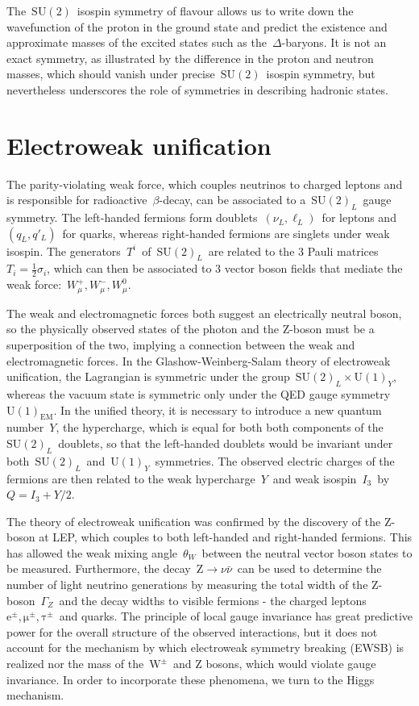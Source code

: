 The~$\mathrm{SU}(2)$~isospin symmetry of flavour allows us to write down the wavefunction of the proton in the ground state and predict the existence and approximate masses of the excited states such as the~$\Delta$-baryons. It is not an exact symmetry, as illustrated by the difference in the proton and neutron masses, which should vanish under precise~$\mathrm{SU}(2)$~isospin symmetry, but nevertheless underscores the role of symmetries in describing hadronic states.

\section{Electroweak unification}
The parity-violating weak force, which couples neutrinos to charged leptons and is responsible for radioactive~$\beta$-decay, can be associated to a~$\mathrm{SU}(2)_L$~gauge symmetry. The left-handed fermions form doublets~$(\nu_L, \mathrm{\ell}_L)$~for leptons and~$(q_L, q'_L)$~for quarks, whereas right-handed fermions are singlets under weak isospin. The generators~$T^i$~of~$\mathrm{SU}(2)_L$~are related to the 3 Pauli matrices~$T_i = \frac{1}{2}\sigma_i$, which can then be associated to 3 vector boson fields that mediate the weak force:~$W^+_\mu, W^-_\mu, W^0_\mu$.

The weak and electromagnetic forces both suggest an electrically neutral boson, so the physically observed states of the photon and the Z-boson must be a superposition of the two, implying a connection between the weak and electromagnetic forces. In the Glashow-Weinberg-Salam theory of electroweak unification, the Lagrangian is symmetric under the group~$\mathrm{SU}(2)_L \times \mathrm{U}(1)_Y$, whereas the vacuum state is symmetric only under the QED gauge symmetry~$\mathrm{U}(1)_{\mathrm{EM}}$. In the unified theory, it is necessary to introduce a new quantum number~$Y$, the hypercharge, which is equal for both both components of the~$\mathrm{SU}(2)_L$~doublets, so that the left-handed doublets would be invariant under both~$\mathrm{SU}(2)_L$~and~$\mathrm{U}(1)_Y$~symmetries. The observed electric charges of the fermions are then related to the weak hypercharge~$Y$~and weak isospin~$I_3$~by~$Q = I_3 + Y/2$.

The theory of electroweak unification was confirmed by the discovery of the Z-boson at LEP, which couples to both left-handed and right-handed fermions. This has allowed the weak mixing angle~$\theta_W$~between the neutral vector boson states to be measured. Furthermore, the decay~$\mathrm{Z} \rightarrow \nu \bar{\nu}$~can be used to determine the number of light neutrino generations by measuring the total width of the Z-boson~$\Gamma_Z$~and the decay widths to visible fermions - the charged leptons~$\mathrm{e}^\pm, \mathrm{\mu}^\pm, \mathrm{\tau}^\pm$~and quarks. The principle of local gauge invariance has great predictive power for the overall structure of the observed interactions, but it does not account for the mechanism by which electroweak symmetry breaking (EWSB) is realized nor the mass of the~$\mathrm{W}^\pm$~and Z bosons, which would violate gauge invariance. In order to incorporate these phenomena, we turn to the Higgs mechanism.

